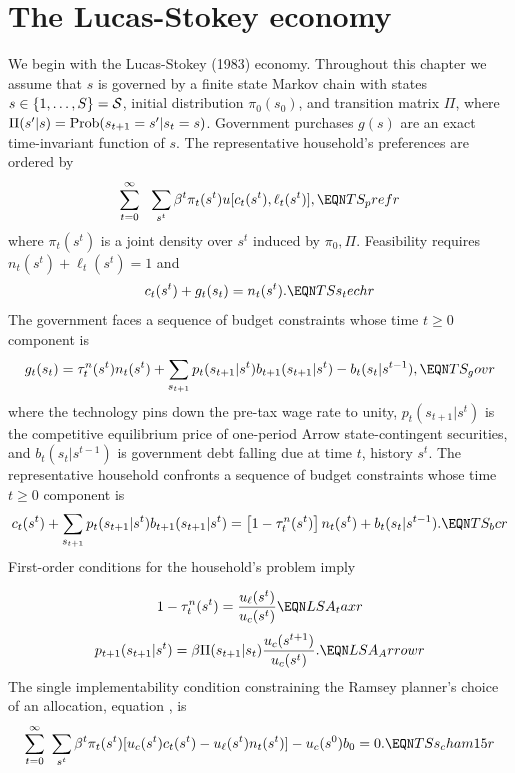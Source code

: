 \section{The Lucas-Stokey economy}\label{sec:appLS}%
We begin with the Lucas-Stokey (1983) economy.
Throughout this chapter we  assume that  $s$ is governed by a finite state Markov chain with
states $s\in \{1, \ldots, S\} = {\cal S} $, initial distribution $\pi_0(s_0)$,
and  transition matrix $\Pi$, where $\Pi(s'|s) = {\rm Prob}(s_{t+1} = s'| s_t =s)$.
Government purchases $g(s)$ are an exact time-invariant function  of
$s$.
The representative household's preferences are ordered by
$$
\sum_{t=0}^\infty\ \ \sum_{s^t} \beta^t \pi_t(s^t) u[c_t(s^t), \ell_t(s^t)] ,
                                                            \EQN TS_prefr $$
where $\pi_t(s^t)$ is a joint density over $s^t$ induced by $\pi_0, \Pi$.
 Feasibility requires $n_t(s^t) + \ell_t(s^t) = 1 $ and
 $$
c_t(s^t) + g_t(s_t) = n_t(s^t).                        \EQN TSs_techr
$$
The government faces a sequence of budget constraints whose time $t \geq 0$ component is
 $$ g_t(s_t) =   \tau^n_t(s^t)  n_t(s^t)
              + \sum_{s_{t+1}} p_t(s_{t+1} | s^t) b_{t+1}(s_{t+1} | s^t)
               - b_t(s_t | s^{t-1}),   \EQN TS_govr $$
where  the technology pins down the pre-tax wage rate to unity, $p_t(s_{t+1}|s^t)$ is the competitive equilibrium price of
one-period Arrow state-contingent securities, and $b_t(s_t|s^{t-1})$ is government debt falling due at time $t$, history $s^t$.
The representative household confronts a sequence of budget constraints whose time $t\geq 0$ component is
$$c_t(s^t) + \sum_{s_{t+1}} p_t(s_{t+1} | s^t) b_{t+1}(s_{t+1} | s^t)
=  \left[1-\tau^n_t(s^t)\right]  n_t(s^t) + b_t(s_t | s^{t-1}) .
         \EQN TS_bcr
$$
First-order conditions for the household's  problem imply

$$ 1 - \tau_t^n(s^t) = {\frac{u_\ell(s^t)}{u_c(s^t)} }  \EQN LSA_taxr $$
$$ p_{t+1}(s_{t+1}| s^t) = \beta \Pi(s_{t+1} | s_t) {\frac{u_c(s^{t+1})}{u_c({s^t})}} .\EQN LSA_Arrowr $$
The single implementability condition constraining the Ramsey planner's choice of an allocation, equation ,
is
$$ \sum_{t=0}^\infty\  \sum_{s^t} \beta^t \pi_t(s^t)
         [u_c(s^t) c_t(s^t) - u_\ell(s^t) n_t(s^t)]
      - u_c(s^0) b_0 = 0.                                    \EQN TSs_cham15r $$


